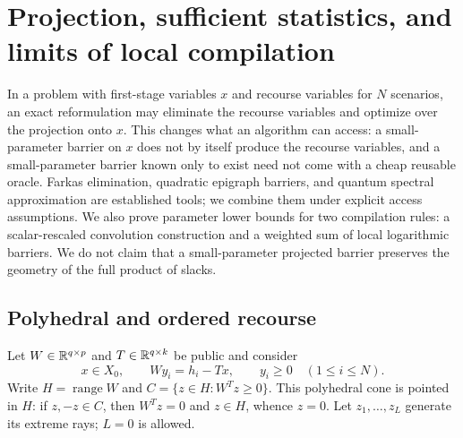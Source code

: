 \section{Projection, sufficient statistics, and limits of local compilation}
\label{sec:projected-compilers}

In a problem with first-stage variables $x$ and recourse variables for
$N$ scenarios, an exact reformulation may eliminate the recourse
variables and optimize over the projection onto $x$.  This changes what
an algorithm can access: a small-parameter barrier on $x$ does not by
itself produce the recourse variables, and a small-parameter barrier
known only to exist need not come with a cheap reusable oracle.  Farkas
elimination, quadratic epigraph barriers, and quantum spectral
approximation are established tools; we combine them under explicit
access assumptions.  We also prove parameter lower bounds for two
compilation rules: a scalar-rescaled convolution construction and a
weighted sum of local logarithmic barriers.  We do not claim that a
small-parameter projected barrier preserves the geometry of the full
product of slacks.

\subsection{Polyhedral and ordered recourse}

Let $W\in\mathbb R^{q\times p}$ and $T\in\mathbb R^{q\times k}$ be public and consider
\begin{equation}\label{eq:projected-recourse}
 x\in X_0,\qquad Wy_i=h_i-Tx,\qquad y_i\geq0\quad(1\leq i\leq N).
\end{equation}
Write $H=\operatorname{range}W$ and
$C=\{z\in H:W^Tz\geq0\}$.  This polyhedral cone is pointed in $H$:
if $z,-z\in C$, then $W^Tz=0$ and $z\in H$, whence $z=0$.
Let $z_1,\ldots,z_L$ generate its extreme rays; $L=0$ is allowed.

